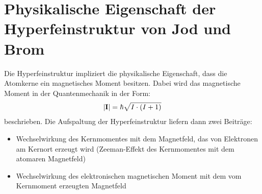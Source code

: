 
\newpage

\section{Physikalische Eigenschaft der Hyperfeinstruktur von Jod und Brom}
\label{sec:hyperfeinstruktur}

Die Hyperfeinstruktur impliziert die physikalische Eigenschaft, dass die Atomkerne ein magnetisches Moment besitzen. Dabei wird das magnetische Moment in der Quantenmechanik in der Form:
\begin{gather}
    \abs{\boldsymbol{\mathbf{I}}} = \hbar \sqrt{I\cdot (I+1)}
\end{gather}
beschrieben. \cite{DemtroederKerne} Die Aufspaltung der Hyperfeinstruktur liefern dann zwei Beiträge:
\begin{itemize}
    \item Wechselwirkung des Kernmomentes mit dem Magnetfeld, das von Elektronen am Kernort erzeugt wird (Zeeman-Effekt des Kernmomentes mit dem atomaren Magnetfeld) \cite{DemtroederAtome}
    \item Wechselwirkung des elektronischen magnetischen Moment mit dem vom Kernmoment erzeugten Magnetfeld \cite{DemtroederAtome}
\end{itemize}
